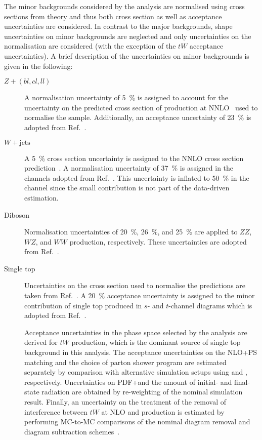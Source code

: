 The minor backgrounds considered by the analysis are normalised using cross
sections from theory and thus both cross section as well as acceptance
uncertainties are considered. In contrast to the major backgrounds, shape
uncertainties on minor backgrounds are neglected and only uncertainties on the
normalisation are considered (with the exception of the $tW$ acceptance
uncertainties).  A brief description of the uncertainties on minor backgrounds
is given in the following:
\begin{description}

\item[$Z + (bl, cl, ll)$] A normalisation uncertainty of \SI{5}{\percent} is
  assigned to account for the uncertainty on the predicted cross section of
  \Zjets production at NNLO~\cite{Anastasiou:2003ds} used to normalise the
  sample. Additionally, an acceptance uncertainty of \SI{23}{\percent} is
  adopted from Ref.~\cite{HIGG-2018-51}.

\item[$W + \text{jets}$] A \SI{5}{\percent} cross section uncertainty is
  assigned to the NNLO cross section prediction~\cite{Anastasiou:2003ds}. A
  normalisation uncertainty of \SI{37}{\percent} is assigned in the \lephad
  channels adopted from Ref.~\cite{HIGG-2018-51}. This uncertainty is inflated
  to \SI{50}{\percent} in the \hadhad channel since the small \Wjets
  contribution is not part of the data-driven \faketauhadvis estimation.

\item[Diboson] Normalisation uncertainties of \SI{20}{\percent},
  \SI{26}{\percent}, and \SI{25}{\percent} are applied to $ZZ$, $WZ$, and $WW$
  production, respectively. These uncertainties are adopted from
  Ref.~\cite{HIGG-2018-51}.

\item[Single top] Uncertainties on the cross section used to normalise the
  predictions are taken from Ref.~\cite{stopxsec}. A \SI{20}{\percent}
  acceptance uncertainty is assigned to the minor contribution of single top
  produced in $s$- and $t$-channel diagrams which is adopted from
  Ref.~\cite{HIGG-2018-51}.

  Acceptance uncertainties in the phase space selected by the analysis are
  derived for $tW$ production, which is the dominant source of single top
  background in this analysis. The acceptance uncertainties on the NLO+PS
  matching and the choice of parton shower program are estimated separately by
  comparison with alternative simulation setups using \MGNLO[2.6.2] and
  \HERWIG[7], respectively. Uncertainties on PDF+\alphas and the amount of
  initial- and final-state radiation are obtained by re-weighting of the nominal
  simulation result. Finally, an uncertainty on the treatment of the removal of
  interference between $tW$ at NLO and \ttbar production is estimated by
  performing MC-to-MC comparisons of the nominal diagram removal and diagram
  subtraction schemes~\cite{Frixione:2008yi}.


\end{description}
